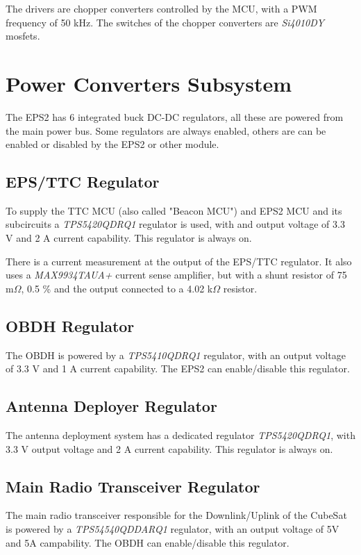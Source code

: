 The drivers are chopper converters controlled by the MCU, with a PWM frequency of 50 kHz. The switches of the chopper converters are \textit{Si4010DY} mosfets.

\section{Power Converters Subsystem}

The EPS2 has 6 integrated buck DC-DC regulators, all these are powered from the main power bus. Some regulators are always enabled, others are can be enabled or disabled by the EPS2 or other module.

\subsection{EPS/TTC Regulator}

To supply the TTC MCU (also called "Beacon MCU") and EPS2 MCU and its subcircuits a \textit{TPS5420QDRQ1} regulator is used, with and output voltage of 3.3 V and 2 A current capability. This regulator is always on.

There is a current measurement at the output of the EPS/TTC regulator. It also uses a \textit{MAX9934TAUA+} current sense amplifier, but with a shunt resistor of 75 m$\Omega$, 0.5 \% and the output connected to a 4.02 k$\Omega$ resistor.

\subsection{OBDH Regulator}

The OBDH is powered by a \textit{TPS5410QDRQ1} regulator, with an output voltage of 3.3 V and 1 A current capability. The EPS2 can enable/disable this regulator.

\subsection{Antenna Deployer Regulator}

The antenna deployment system has a dedicated regulator \textit{TPS5420QDRQ1}, with 3.3 V output voltage and 2 A current capability. This regulator is always on.

\subsection{Main Radio Transceiver Regulator}

The main radio transceiver responsible for the Downlink/Uplink of the CubeSat is powered by a \textit{TPS54540QDDARQ1} regulator, with an output voltage of 5V and 5A campability. The OBDH can enable/disable this regulator.


